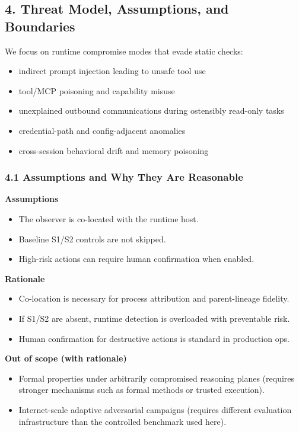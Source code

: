 \documentclass[
]{article}
\providecommand{\tightlist}{%
  \setlength{\itemsep}{0pt}\setlength{\parskip}{0pt}}
\begin{document}
\subsection{4. Threat Model, Assumptions, and
Boundaries}\label{threat-model-assumptions-and-boundaries}

We focus on runtime compromise modes that evade static checks:

\begin{itemize}
\tightlist
\item
  indirect prompt injection leading to unsafe tool use
\item
  tool/MCP poisoning and capability misuse
\item
  unexplained outbound communications during ostensibly read-only tasks
\item
  credential-path and config-adjacent anomalies
\item
  cross-session behavioral drift and memory poisoning
\end{itemize}

\subsubsection{4.1 Assumptions and Why They Are
Reasonable}\label{assumptions-and-why-they-are-reasonable}

\textbf{Assumptions}

\begin{itemize}
\tightlist
\item
  The observer is co-located with the runtime host.
\item
  Baseline S1/S2 controls are not skipped.
\item
  High-risk actions can require human confirmation when enabled.
\end{itemize}

\textbf{Rationale}

\begin{itemize}
\tightlist
\item
  Co-location is necessary for process attribution and parent-lineage
  fidelity.
\item
  If S1/S2 are absent, runtime detection is overloaded with preventable
  risk.
\item
  Human confirmation for destructive actions is standard in production
  ops.
\end{itemize}

\textbf{Out of scope (with rationale)}

\begin{itemize}
\tightlist
\item
  Formal properties under arbitrarily compromised reasoning planes
  (requires stronger mechanisms such as formal methods or trusted
  execution).
\item
  Internet-scale adaptive adversarial campaigns (requires different
  evaluation infrastructure than the controlled benchmark used here).
\end{itemize}
\end{document}
